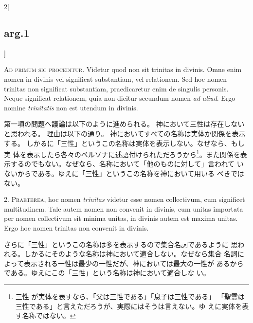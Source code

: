 \documentclass[paper=a4paper,fontsize=10pt,jafontsize=9pt,titlepage]{jlreq}
\begin{document}
{}
\setcounter{section}{1}
\setcounter{subsection}{0}

\begin{paracol}{2}[\subsection{arg.1}]

{\scshape Ad primum sic proceditur}. Videtur quod non sit trinitas in
divinis. Omne enim nomen in divinis vel significat substantiam, vel
relationem. Sed hoc nomen trinitas non significat substantiam,
praedicaretur enim de singulis personis. Neque significat relationem,
quia non dicitur secundum nomen {\itshape ad aliud}. Ergo nomine {\itshape trinitatis} non
est utendum in divinis.

\switchcolumn

第一項の問題へ議論は以下のように進められる。
神において三性は存在しないと思われる。
理由は以下の通り。
神においてすべての名称は実体か関係を表示する。
しかるに「三性」というこの名称は実体を表示しない。なぜなら、もし実
 体を表示したら各々のペルソナに述語付けられただろうから\footnote{三性
が実体を表すなら、「父は三性である」「息子は三性である」
 「聖霊は三性である」と言えただろうが、実際にはそうは言えない。ゆ
 えに実体を表す名称ではない。}。また関係を表
 示するのでもない。なぜなら、名称において「他のものに対して」言われて
 いないからである。ゆえに「三性」というこの名称を神において用いる
 べきではない。


2. {\scshape Praeterea}, hoc nomen {\itshape trinitas} videtur esse nomen collectivum, cum
significet multitudinem. Tale autem nomen non convenit in divinis, cum
unitas importata per nomen collectivum sit minima unitas, in divinis
autem est maxima unitas. Ergo hoc nomen trinitas non convenit in
divinis.

\switchcolumn

さらに「三性」というこの名称は多を表示するので集合名詞であるように
 思われる。しかるにそのような名称は神において適合しない。なぜなら集合
 名詞によって表示される一性は最少の一性だが、神においては最大の一性が
 あるからである。ゆえにこの「三性」という名称は神において適合しな
 い。



\end{paracol}
\end{document}
